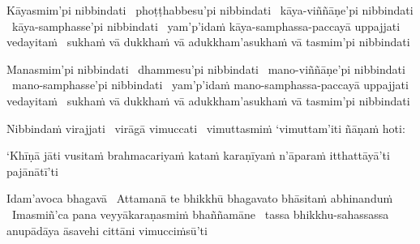 \begin{pali-hang}
  Kāyasmim'pi nibbindati \breathmark\ phoṭṭhabbesu'pi nibbindati \breathmark\ kāya-viññāṇe'pi nibbindati \breathmark\ kāya-samphasse'pi nibbindati \breathmark\ yam'p'idaṁ kāya-samphassa-paccayā uppajjati vedayitaṁ \breathmark\ sukhaṁ vā dukkhaṁ vā adukkham'asukhaṁ vā tasmim'pi nibbindati
\end{pali-hang}

\begin{pali-hang}
  Manasmim'pi nibbindati \breathmark\ dhammesu'pi nibbindati \breathmark\ mano-viññāṇe'pi nibbindati \breathmark\ mano-samphasse'pi nibbindati \breathmark\ yam'p'idaṁ mano-samphassa-paccayā uppajjati vedayitaṁ \breathmark\ sukhaṁ vā dukkhaṁ vā adukkham'asukhaṁ vā tasmim'pi nibbindati
\end{pali-hang}

\begin{pali-hang}
  Nibbindaṁ virajjati \breathmark\ virāgā vimuccati \breathmark\ vimuttasmiṁ `vimuttam'iti ñāṇaṁ hoti:
\end{pali-hang}

\begin{pali-hang}
  `Khīṇā jāti vusitaṁ brahmacariyaṁ kataṁ karaṇīyaṁ n'āparaṁ itthattāyā'ti pajānātī'ti
\end{pali-hang}

\begin{pali-hang}
  Idam'avoca bhagavā \breathmark\ Attamanā te bhikkhū bhagavato bhāsitaṁ abhinanduṁ \breathmark\ Imasmiñ'ca pana veyyākaraṇasmiṁ bhaññamāne \breathmark\ tassa bhikkhu-sahassassa anupādāya āsavehi cittāni vimucciṁsū'ti
\end{pali-hang}

\suttaRef{[SN 35.28]}

\ifdigitalversion{}\fi


